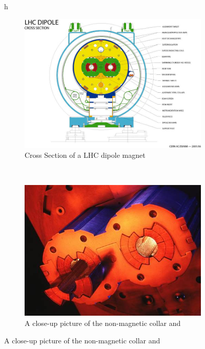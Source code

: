 \begin{figure}{h}
    \centering
    \begin{subfigure}[h]{0.450\textwidth}
        \includegraphics[width=\textwidth]{Figures/LHC_Diagrams/LHC_XSec_Dipole_Magnet__LHC-PHO-2001-187.jpg}
        \caption{Cross Section of a LHC dipole magnet}\label{fig:lhc_dipole_xs}
      \end{subfigure}
      ~ %
    \begin{subfigure}[h]{0.450\textwidth}
        \includegraphics[width=\textwidth]{Figures/LHC_Diagrams/LHC_Dipole_CollarAndCoils.jpg}
        \caption{A close-up picture of the non-magnetic collar and
}
\end{subfigure}
\end{figure}
